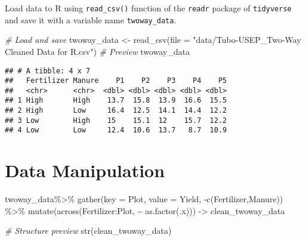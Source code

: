 \documentclass[
]{book}
\newenvironment{Shaded}{\begin{snugshade}}{\end{snugshade}}
\newcommand{\AttributeTok}[1]{\textcolor[rgb]{0.77,0.63,0.00}{#1}}
\newcommand{\CommentTok}[1]{\textcolor[rgb]{0.56,0.35,0.01}{\textit{#1}}}
\newcommand{\FunctionTok}[1]{\textcolor[rgb]{0.00,0.00,0.00}{#1}}
\newcommand{\NormalTok}[1]{#1}
\newcommand{\OtherTok}[1]{\textcolor[rgb]{0.56,0.35,0.01}{#1}}
\newcommand{\SpecialCharTok}[1]{\textcolor[rgb]{0.00,0.00,0.00}{#1}}
\newcommand{\StringTok}[1]{\textcolor[rgb]{0.31,0.60,0.02}{#1}}
\begin{document}
Load data to R using \texttt{read\_csv()} function of the \texttt{readr} package of \texttt{tidyverse} and save it with a variable name \texttt{twoway\_data}.

\begin{Shaded}
\begin{Highlighting}[]
\CommentTok{\# Load and save}
\NormalTok{twoway\_data }\OtherTok{\textless{}{-}} \FunctionTok{read\_csv}\NormalTok{(}\AttributeTok{file =} \StringTok{"data/Tubo{-}USEP\_Two{-}Way Cleaned Data for R.csv"}\NormalTok{)}
\CommentTok{\# Preview}
\NormalTok{twoway\_data}
\end{Highlighting}
\end{Shaded}

\begin{verbatim}
## # A tibble: 4 x 7
##   Fertilizer Manure    P1    P2    P3    P4    P5
##   <chr>      <chr>  <dbl> <dbl> <dbl> <dbl> <dbl>
## 1 High       High    13.7  15.8  13.9  16.6  15.5
## 2 High       Low     16.4  12.5  14.1  14.4  12.2
## 3 Low        High    15    15.1  12    15.7  12.2
## 4 Low        Low     12.4  10.6  13.7   8.7  10.9
\end{verbatim}

\hypertarget{data-manipulation-1}{%
\chapter{Data Manipulation}\label{data-manipulation-1}}

\begin{Shaded}
\begin{Highlighting}[]
\NormalTok{twoway\_data}\SpecialCharTok{\%\textgreater{}\%} 
  \FunctionTok{gather}\NormalTok{(}\AttributeTok{key =}\NormalTok{ Plot, }\AttributeTok{value =}\NormalTok{ Yield, }\SpecialCharTok{{-}}\FunctionTok{c}\NormalTok{(Fertilizer,Manure)) }\SpecialCharTok{\%\textgreater{}\%} 
  \FunctionTok{mutate}\NormalTok{(}\FunctionTok{across}\NormalTok{(Fertilizer}\SpecialCharTok{:}\NormalTok{Plot, }\SpecialCharTok{\textasciitilde{}} \FunctionTok{as.factor}\NormalTok{(.x))) }\OtherTok{{-}\textgreater{}}\NormalTok{ clean\_twoway\_data}
\end{Highlighting}
\end{Shaded}

\begin{Shaded}
\begin{Highlighting}[]
\CommentTok{\# Structure preview}
\FunctionTok{str}\NormalTok{(clean\_twoway\_data)}
\end{Highlighting}
\end{Shaded}
\end{document}

